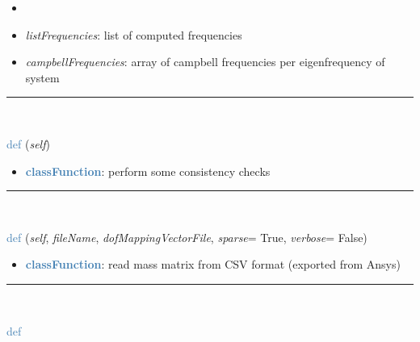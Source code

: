 \begin{itemize}[leftmargin=1.4cm]
\begin{itemize}[leftmargin=1.4cm]
\begin{itemize}[leftmargin=1.4cm]
\begin{itemize}[leftmargin=0.5cm]
\begin{itemize}[leftmargin=1.4cm]
\begin{itemize}[leftmargin=1.4cm]
\begin{itemize}[leftmargin=1.4cm]
\begin{itemize}[leftmargin=0.5cm]
\begin{itemize}[leftmargin=0.7cm]
\begin{itemize}[leftmargin=1.2cm]
\setlength{\itemindent}{-0.7cm}
\item[][listFrequencies, campbellFrequencies]
\item[]{\it listFrequencies}: list of computed frequencies
\item[]{\it campbellFrequencies}: array of campbell frequencies per eigenfrequency of system
\end{itemize}
\vspace{12pt}\end{itemize}
%
\noindent\rule{8cm}{0.75pt}\vspace{1pt} \\ 
\begin{flushleft}
\noindent \textcolor{steelblue}{def {\bf {}}}\label{sec:FEM:FEMinterface:CheckConsistency}
({\it self})
\end{flushleft}
\setlength{\itemindent}{0.7cm}
\begin{itemize}[leftmargin=0.7cm]
\item[--]\textcolor{steelblue}{\bf classFunction}: perform some consistency checks
\vspace{12pt}\end{itemize}
%
\noindent\rule{8cm}{0.75pt}\vspace{1pt} \\ 
\begin{flushleft}
\noindent \textcolor{steelblue}{def {\bf {}}}\label{sec:FEM:FEMinterface:ReadMassMatrixFromAnsys}
({\it self}, {\it fileName}, {\it dofMappingVectorFile}, {\it sparse}= True, {\it verbose}= False)
\end{flushleft}
\setlength{\itemindent}{0.7cm}
\begin{itemize}[leftmargin=0.7cm]
\item[--]\textcolor{steelblue}{\bf classFunction}: read mass matrix from CSV format (exported from Ansys)
\vspace{12pt}\end{itemize}
%
\noindent\rule{8cm}{0.75pt}\vspace{1pt} \\ 
\begin{flushleft}
\noindent \textcolor{steelblue}{def {\bf {}}}\label{sec:FEM:FEMinterface:ReadStiffnessMatrixFromAnsys}

\end{flushleft}
\end{itemize}
\end{itemize}
\end{itemize}
\end{itemize}
\end{itemize}
\end{itemize}
\end{itemize}
\end{itemize}
